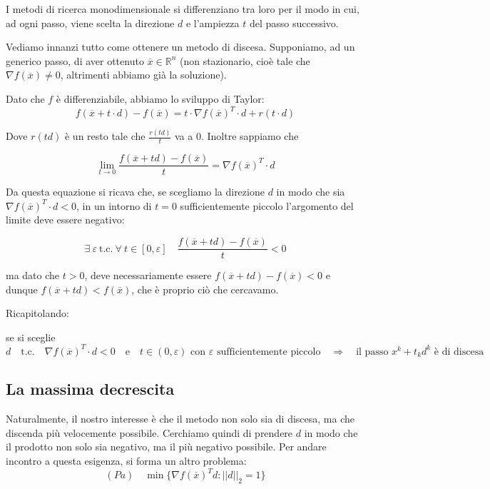 I metodi di ricerca monodimensionale si differenziano tra loro
per il modo in cui, ad ogni passo, viene scelta la
direzione $d$ e l'ampiezza $t$ del passo successivo.

Vediamo innanzi tutto come ottenere un metodo di discesa. Supponiamo,
ad un generico passo, di aver ottenuto $ \overline{x} \in
\mathbb{R}^{n}$ (non stazionario, cio\`e tale che $\nabla
f(\overline{x}) \neq 0$, altrimenti abbiamo gi\`a la soluzione).

Dato che $f$ \`e differenziabile, abbiamo lo sviluppo di Taylor:
$$f(\overline{x} +t \cdot d) -f(\overline{x}) = t \cdot \nabla f(\overline{x})^{T} \cdot d + r(t \cdot d)$$

Dove $r(td)$ \`e un resto tale che $\frac{r(td)}{t}$ va a $0$. Inoltre
sappiamo che

$$ \lim_{t \to 0} \frac{f(\overline{x}+td)- f(\overline{x})}{t} = \nabla f(\overline{x})^{T} \cdot d $$

Da questa equazione si ricava che, se scegliamo la direzione $d$ in
modo che sia $\nabla f(\overline{x})^{T} \cdot d < 0$, in un intorno
di $t=0$ sufficientemente piccolo l'argomento del limite deve essere
negativo:

$$\exists ~ \varepsilon ~ \text{t.c.}~ \forall ~ t \in [0,\varepsilon] \quad \frac{f(\overline{x}+td)- f(\overline{x})}{t} < 0$$

ma dato che $t>0$, deve necessariamente essere $f(\overline{x}+td)-
f(\overline{x}) < 0$ e dunque $f(\overline{x}+td) < f(\overline{x})$,
che \`e proprio ciò che cercavamo.

Ricapitolando:
\begin{property}
\label{prop:metodo-discesa-gradiente-direzione} se si sceglie
$$d \quad \text{t.c.} \quad \nabla f(\overline{x})^{T} \cdot d < 0 \quad \text{e} \quad  t \in (0, \varepsilon) \text{ con }\varepsilon\text{ sufficientemente piccolo} \quad \Longrightarrow \quad \text{il passo } x^{k} + t_k d^{k} \text{ \`e di discesa} $$
\end{property}
\subsection{La massima decrescita}
\label{subsection:massima-decrescita} Naturalmente, il nostro
interesse \`e che il metodo non solo sia di discesa, ma che discenda pi\`u
velocemente possibile. Cerchiamo quindi di prendere $d$ in modo che il
prodotto non solo sia negativo, ma il pi\`u negativo possibile. Per
andare incontro a questa esigenza, si forma un altro problema:
\begin{equation}
\label{prob:pa} (Pa) \quad \min \{ \nabla f(\overline{x})^{T}d :
||d||_2 = 1 \}
\end{equation}

